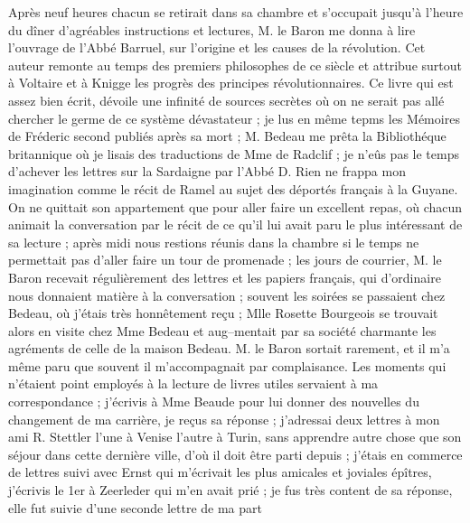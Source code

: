 \documentclass[12pt]{article}
\begin{document}
 Après neuf heures chacun se retirait dans sa
chambre et s’occupait jusqu’à l’heure du dîner d’agréables instructions et lectures, M. le Baron me
donna à lire l’ouvrage de l’Abbé Barruel, sur l’origine et les causes de la révolution. Cet auteur
remonte au temps des premiers philosophes de ce siècle et attribue surtout à Voltaire et à Knigge
les progrès des principes révolutionnaires. Ce livre qui est assez bien écrit, dévoile une infinité
de sources secrètes où on ne serait pas allé chercher le germe de ce système dévastateur ; je lus en
même tepms les Mémoires de Fréderic second publiés après sa mort ; M. Bedeau me prêta la
Bibliothéque britannique où je lisais des traductions de Mme de Radclif ; je n’eûs pas le temps
d’achever les lettres sur la Sardaigne par l’Abbé D. Rien ne frappa mon imagination comme le récit
de Ramel au sujet des déportés français à la Guyane. On ne quittait son appartement que pour aller
faire un excellent repas, où chacun animait la conversation par le récit de ce qu’il lui avait paru
le plus intéressant de sa lecture ; après midi nous restions réunis dans la chambre si le temps ne
permettait pas d’aller faire un tour de promenade ; les jours de courrier, M. le Baron recevait
régulièrement des lettres et les papiers français, qui d’ordinaire nous donnaient matière à la
conversation ; souvent les soirées se passaient chez Bedeau, où j’étais très honnêtement reçu ; Mlle
Rosette Bourgeois se trouvait alors en visite chez Mme Bedeau et aug–mentait par sa société
charmante les agréments de celle de la maison Bedeau. M. le Baron sortait rarement, et il m’a même
paru que souvent il m’accompagnait par complaisance. Les moments qui n’étaient point employés à la
lecture de livres utiles servaient à ma correspondance ; j’écrivis à Mme Beaude pour lui donner des
nouvelles du changement de ma carrière, je reçus sa réponse ; j’adressai deux lettres à mon ami R.
Stettler l’une à Venise l’autre à Turin, sans apprendre autre chose que son séjour dans cette
dernière ville, d’où il doit être parti depuis ; j’étais en commerce de lettres suivi avec Ernst qui
m’écrivait les plus amicales et joviales épîtres, j’écrivis le 1er à Zeerleder qui m’en avait prié ;
je fus très content de sa réponse, elle fut suivie d’une seconde lettre de ma part
\end{document}
